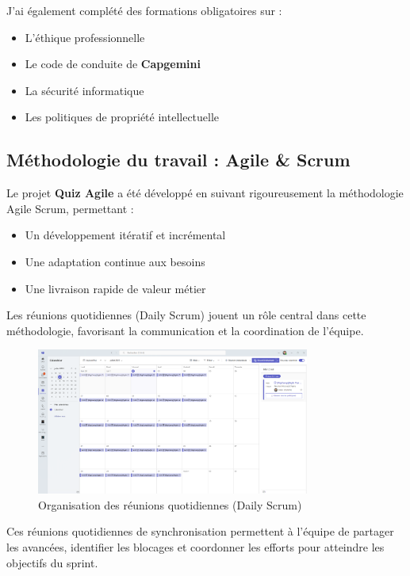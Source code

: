 \documentclass[12pt,a4paper]{report}
\begin{document}
J'ai également complété des formations obligatoires sur :
\begin{itemize}
\item L'éthique professionnelle
\item Le code de conduite de \textbf{Capgemini}
\item La sécurité informatique
\item Les politiques de propriété intellectuelle
\end{itemize}

\subsection{Méthodologie du travail : Agile \& Scrum}

Le projet \textbf{Quiz Agile} a été développé en suivant rigoureusement la méthodologie Agile Scrum, permettant :
\begin{itemize}
\item Un développement itératif et incrémental
\item Une adaptation continue aux besoins
\item Une livraison rapide de valeur métier
\end{itemize}

Les réunions quotidiennes (Daily Scrum) jouent un rôle central dans cette méthodologie, favorisant la communication et la coordination de l'équipe.

\begin{figure}[H]
\centering
\includegraphics[width=0.8\textwidth]{latex_media/media/image9.png}
\caption{Organisation des réunions quotidiennes (Daily Scrum)}
\label{fig:daily-scrum}
\end{figure}

Ces réunions quotidiennes de synchronisation permettent à l'équipe de partager les avancées, identifier les blocages et coordonner les efforts pour atteindre les objectifs du sprint.
\end{document}
